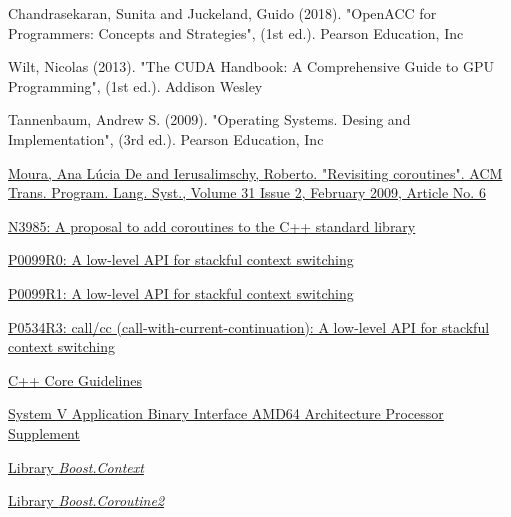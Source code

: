 \begin{thebibliography}{99}

        {Chandrasekaran, Sunita and Juckeland, Guido (2018). "OpenACC for Programmers: Concepts and Strategies", (1st ed.).
         Pearson Education, Inc}

        {Wilt, Nicolas (2013). "The CUDA Handbook: A Comprehensive Guide to GPU Programming", (1st ed.).
         Addison Wesley}

        {Tannenbaum, Andrew S. (2009). "Operating Systems. Desing and Implementation", (3rd ed.).
         Pearson Education, Inc}

        \href{http://www.inf.puc-rio.br/~roberto/docs/MCC15-04.pdf}
        {Moura, Ana L\'{u}cia De and Ierusalimschy, Roberto. "Revisiting coroutines".
         ACM Trans. Program. Lang. Syst., Volume 31 Issue 2, February 2009, Article No. 6}

        \href{http://isocpp.org/files/papers/n3985.pdf}
        {N3985: A proposal to add coroutines to the C++ standard library}

        \href{http://www.open-std.org/jtc1/sc22/wg21/docs/papers/2015/p0099r0.pdf}
        {P0099R0: A low-level API for stackful context switching}

        \href{http://www.open-std.org/jtc1/sc22/wg21/docs/papers/2016/p0099r1.pdf}
        {P0099R1: A low-level API for stackful context switching}

        \href{http://www.open-std.org/jtc1/sc22/wg21/docs/papers/2017/p0534r3.pdf}
        {P0534R3: call/cc (call-with-current-continuation): A low-level API for stackful
        context switching}

        \href{http://isocpp.github.io/CppCoreGuidelines/CppCoreGuidelines#Ri-global}
        {C++ Core Guidelines}

        \href{http://software.intel.com/sites/default/files/article/402129/mpx-linux64-abi.pdf}
        {System V Application Binary Interface AMD64 Architecture Processor
        Supplement}

        \href{http://www.boost.org/doc/libs/release/libs/context/doc/html/index.html}
        {Library \emph{Boost.Context}}

        \href{http://www.boost.org/doc/libs/release/libs/coroutine2/doc/html/index.html}
        {Library \emph{Boost.Coroutine2}}


\end{thebibliography}
